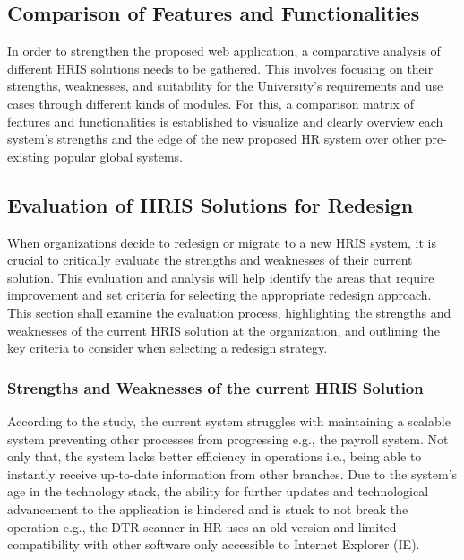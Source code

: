     \subsection{Comparison of Features and Functionalities}
    In order to strengthen the proposed web application, a comparative analysis of different HRIS solutions needs to be gathered. This involves focusing on their strengths, weaknesses, and suitability for the University's requirements and use cases through different kinds of modules. For this, a comparison matrix of features and functionalities is established to visualize and clearly overview each system's strengths and the edge of the new proposed HR system over other pre-existing popular global systems.
    
    
    
    \subsection{Evaluation of HRIS Solutions for Redesign}
    
    When organizations decide to redesign or migrate to a new HRIS system, it is crucial to critically evaluate the strengths and weaknesses of their current solution. This evaluation and analysis will help identify the areas that require improvement and set criteria for selecting the appropriate redesign approach. This section shall examine the evaluation process, highlighting the strengths and weaknesses of the current HRIS solution at the organization, and outlining the key criteria to consider when selecting a redesign strategy.
    
        \subsubsection{Strengths and Weaknesses of the current HRIS Solution}
        According to the study, the current system struggles with maintaining a scalable system preventing other processes from progressing e.g., the payroll system. Not only that, the system lacks better efficiency in operations i.e., being able to instantly receive up-to-date information from other branches. Due to the system's age in the technology stack, the ability for further updates and technological advancement to the application is hindered and is stuck to not break the operation e.g., the DTR scanner in HR uses an old version and limited compatibility with other software only accessible to Internet Explorer (IE). 
        \\

